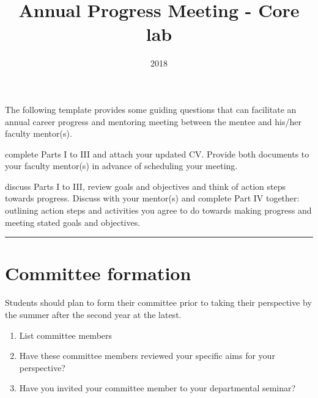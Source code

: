 \documentclass[12pt]{article}
\title{Annual Progress Meeting - Core lab}
\date{2018}
\newcommand{\tbox}{\\ \framebox[\linewidth][l]{\phantom{X}}}
\begin{document}
\noindent
The following template provides some guiding questions that can facilitate an
annual career progress and mentoring meeting between the mentee and his/her
faculty mentor(s).

\begin{description}[leftmargin=0pt]
\item[Student / Postdoc:] complete Parts I to III and attach your updated CV.
  Provide both documents to your faculty mentor(s) in advance of scheduling your
  meeting.
\item[Student / Postdoc and Faculty Mentor(s):] discuss Parts I to III, review
  goals and objectives and think of action steps towards progress.  Discuss with
  your mentor(s) and complete Part IV together: outlining action steps and
  activities you agree to do towards making progress and meeting stated goals
  and objectives.
\end{description}

\noindent\rule{\linewidth}{0.4pt}

\section{Committee formation}
Students should plan to form their committee prior to taking their perspective
by the summer after the second year at the latest.
\begin{enumerate}
\item List committee members \tbox{}
\item Have these committee members reviewed your specific aims for your
  perspective?  \tbox{}
\item Have you invited your committee member to your departmental seminar?
  \tbox{}
\end{enumerate}
\end{document}
